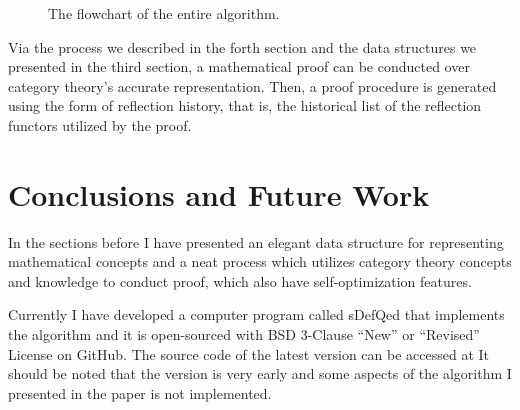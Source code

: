 \documentclass{article}
\numberwithin{theorem}{section}	%
\numberwithin{axiom}{section}	%
\numberwithin{definition}{section}	%
\begin{document}
\begin{figure}[h!]
\caption{The flowchart of the entire algorithm.}
\end{figure}

Via the process we described in the forth section and the data structures we presented in the third section, a mathematical proof can be conducted over category theory{'}s accurate representation. Then, a proof procedure is generated using the form of reflection history, that is, the historical list of the reflection functors utilized by the proof.

\section{Conclusions and Future Work}

In the sections before I have presented an elegant data structure for representing mathematical concepts and a neat process which utilizes category theory concepts and knowledge to conduct proof, which also have self-optimization features.

Currently I have developed a computer program called sDefQed that implements the algorithm and it is open-sourced with BSD 3-Clause {``}New{''} or {``}Revised{''} License on GitHub. The source code of the latest version can be accessed at \cite{7} It should be noted that the version is very early and some aspects of the algorithm I presented in the paper is not implemented.
\end{document}
